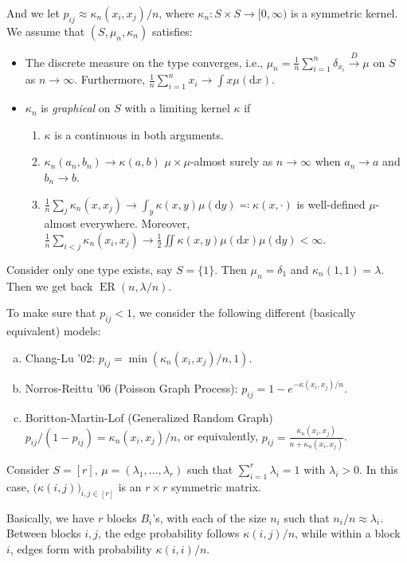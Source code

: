 And we let \(p_{ij} \approx \kappa _n(x_i, x_j) / n\), where \(\kappa _n \colon S \times S \to [0, \infty )\) is a symmetric kernel. We assume that \((S, \mu _n, \kappa _n)\) satisfies:
\begin{itemize}
	\item The discrete measure on the type converges, i.e., \(\mu _n = \frac{1}{n} \sum_{i=1}^{n} \delta _{x_i} \overset{D}{\to} \mu \) on \(S\) as \(n \to \infty \). Furthermore, \(\frac{1}{n} \sum_{i=1}^{n} x_i \to \int x \mu (\mathrm{d} x)\).
	\item \(\kappa _n\) is \emph{graphical} on \(S\) with a limiting kernel \(\kappa \) if
	      \begin{enumerate}
		      \item \(\kappa \) is a continuous in both arguments.
		      \item \(\kappa _n(a_n, b_n) \to \kappa (a, b)\) \(\mu \times \mu \)-almost surely as \(n \to \infty \) when \(a_n \to a\) and \(b_n \to b\).
		      \item \(\frac{1}{n} \sum_{j} \kappa _n(x, x_j) \to \int _y \kappa (x, y) \mu (\mathrm{d} y) \eqqcolon \kappa (x, \cdot ) \) is well-defined \(\mu \)-almost everywhere. Moreover, \(\frac{1}{n} \sum_{i < j} \kappa _n(x_i, x_j) \to \frac{1}{2} \iint \kappa (x, y) \mu (\mathrm{d} x) \mu (\mathrm{d} y) < \infty \).
	      \end{enumerate}
\end{itemize}

\begin{eg}
	Consider only one type exists, say \(S = \{ 1 \} \). Then \(\mu _n = \delta _1\) and \(\kappa _n(1, 1) = \lambda \). Then we get back \(\operatorname{ER}(n, \lambda / n) \).
\end{eg}

To make sure that \(p_{ij} < 1\), we consider the following different (basically equivalent) models:
\begin{enumerate}[(a)]
	\item Chang-Lu '02: \(p_{ij} = \min (\kappa _n(x_i, x_j) / n , 1)\).
	\item Norros-Reittu '06 (Poisson Graph Process): \(p_{ij} = 1 - e^{- \kappa (x_i, x_j) / n}\).
	\item Boritton-Martin-Lof (Generalized Random Graph) \(p_{ij} / (1 - p_{ij}) = \kappa _n(x_i, x_j) / n\), or equivalently, \(p_{ij} = \frac{\kappa _n(x_i, x_j)}{n + \kappa _n(x_i, x_j)}\).
\end{enumerate}

\begin{eg}
	Consider \(S = [r]\), \(\mu = (\lambda _1, \dots , \lambda _r)\) such that \(\sum_{i=1}^{r} \lambda _i = 1\) with \(\lambda _i > 0\). In this case, \(\big(\kappa (i, j)\big)_{i, j \in [r]}\) is an \(r \times r\) symmetric matrix.

	Basically, we have \(r\) blocks \(B_i\)'s, with each of the size \(n_i\) such that \(n_i / n \approx \lambda _i\). Between blocks \(i, j\), the edge probability follows \(\kappa (i, j) / n\), while within a block \(i\), edges form with probability \(\kappa (i, i) / n\).
\end{eg}

